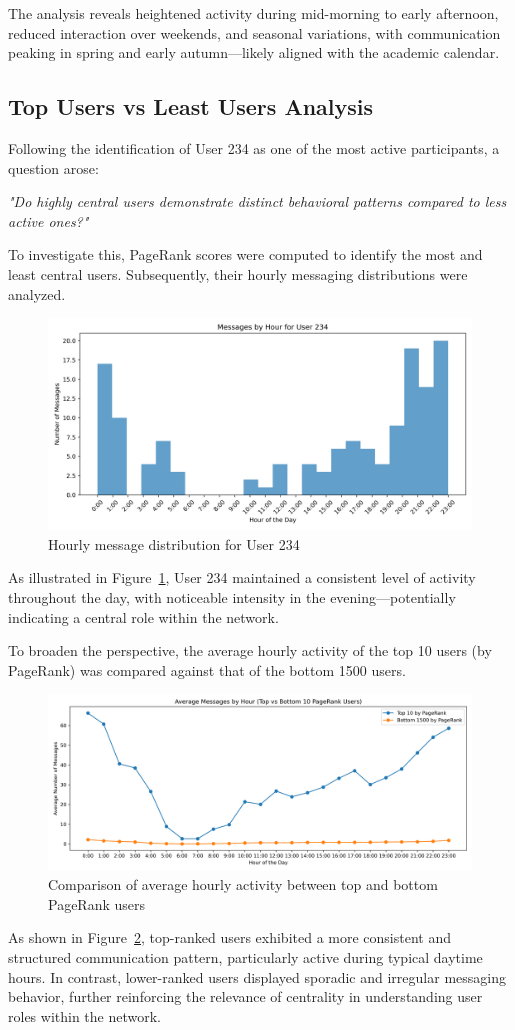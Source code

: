 The analysis reveals heightened activity during mid-morning to early afternoon, reduced interaction over weekends, and seasonal variations, with communication peaking in spring and early autumn—likely aligned with the academic calendar.

\subsection{Top Users vs Least Users Analysis}

Following the identification of User 234 as one of the most active participants, a question arose:

\textit{"Do highly central users demonstrate distinct behavioral patterns compared to less active ones?"}

To investigate this, PageRank scores were computed to identify the most and least central users. Subsequently, their hourly messaging distributions were analyzed.

\begin{figure}[H]
    \centering
    \includegraphics[width=0.6\linewidth]{../Images/user_234_messages_by_hour.png}
    \caption{Hourly message distribution for User 234}
    \label{fig:user234-hourly}
\end{figure}

As illustrated in Figure~\ref{fig:user234-hourly}, User 234 maintained a consistent level of activity throughout the day, with noticeable intensity in the evening—potentially indicating a central role within the network.

To broaden the perspective, the average hourly activity of the top 10 users (by PageRank) was compared against that of the bottom 1500 users.

\begin{figure}[H]
    \centering
    \includegraphics[width=0.5\linewidth]{../Images/average_messages_by_hour_top_bottom.png}
    \caption{Comparison of average hourly activity between top and bottom PageRank users}
    \label{fig:top-vs-bottom}
\end{figure}

As shown in Figure~\ref{fig:top-vs-bottom}, top-ranked users exhibited a more consistent and structured communication pattern, particularly active during typical daytime hours. In contrast, lower-ranked users displayed sporadic and irregular messaging behavior, further reinforcing the relevance of centrality in understanding user roles within the network.
